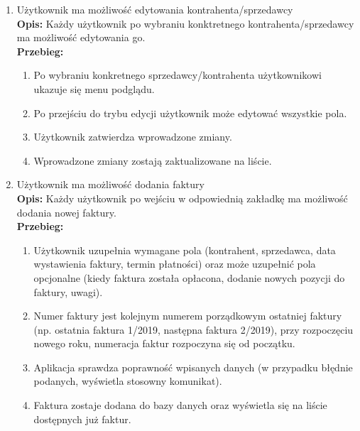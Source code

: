 \begin{enumerate}
    \item Użytkownik ma możliwość edytowania kontrahenta/sprzedawcy\\
    \textbf{Opis: } Każdy użytkownik po wybraniu konktretnego kontrahenta/sprzedawcy ma możliwość edytowania go.\\
    \textbf{Przebieg: }
    \begin{enumerate}
        \item Po wybraniu konkretnego sprzedawcy/kontrahenta użytkownikowi ukazuje się menu podglądu.
        \item Po przejściu do trybu edycji użytkownik może edytować wszystkie pola.
        \item Użytkownik zatwierdza wprowadzone zmiany.
        \item Wprowadzone zmiany zostają zaktualizowane na liście.\\
    \end{enumerate}
    
    \item Użytkownik ma możliwość dodania faktury \\
    \textbf{Opis: } Każdy użytkownik po wejściu w odpowiednią zakładkę ma możliwość dodania nowej faktury.\\
    \textbf{Przebieg: }
    \begin{enumerate}
        \item Użytkownik uzupełnia wymagane pola (kontrahent, sprzedawca, data wystawienia faktury, termin płatności) oraz może uzupełnić pola opcjonalne (kiedy faktura została opłacona, dodanie nowych pozycji do faktury, uwagi).
        \item Numer faktury jest kolejnym numerem porządkowym ostatniej faktury (np. ostatnia faktura 1/2019, następna faktura 2/2019), przy rozpoczęciu nowego roku, numeracja faktur rozpoczyna się od początku.
        \item Aplikacja sprawdza poprawność wpisanych danych (w przypadku błędnie podanych, wyświetla stosowny komunikat).
        \item Faktura zostaje dodana do bazy danych oraz wyświetla się na liście dostępnych już faktur.\\
    \end{enumerate}
    

\end{enumerate}
